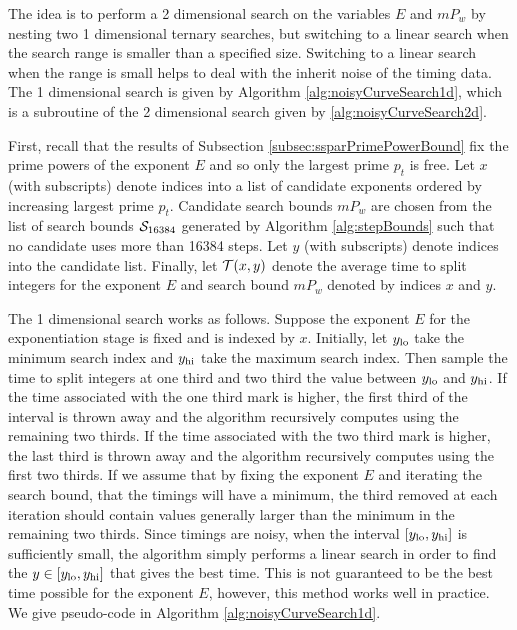 \documentclass{ucalgthes1}
\theoremstyle{definition}
\begin{document}
The idea is to perform a 2 dimensional search on the variables $E$ and $mP_w$ by nesting two 1 dimensional ternary searches, but switching to a linear search when the search range is smaller than a specified size.  Switching to a linear search when the range is small helps to deal with the inherit noise of the timing data.  The 1 dimensional search is given by Algorithm \ref{alg:noisyCurveSearch1d}, which is a subroutine of the 2 dimensional search given by \ref{alg:noisyCurveSearch2d}.

First, recall that the results of Subsection \ref{subsec:ssparPrimePowerBound} fix the prime powers of the exponent $E$ and so only the largest prime $p_t$ is free.  Let $x$ (with subscripts) denote indices into a list of candidate exponents ordered by increasing largest prime $p_t$.  Candidate search bounds $mP_w$ are chosen from the list of search bounds $\mathcal S_{16384}$ generated by Algorithm \ref{alg:stepBounds} such that no candidate uses more than 16384 steps.  Let $y$ (with subscripts) denote indices into the candidate list.  Finally, let $\mathcal T(x, y)$ denote the average time to split integers for the exponent $E$ and search bound $mP_w$ denoted by indices $x$ and $y$.

The 1 dimensional search works as follows.  Suppose the exponent $E$ for the exponentiation stage is fixed and is indexed by $x$. Initially, let $y_{\textrm{lo}}$ take the minimum search index and $y_{\textrm{hi}}$ take the maximum search index.  Then sample the time to split integers at one third and two third the value between $y_{\textrm{lo}}$ and $y_{\textrm{hi}}$.  If the time associated with the one third mark is higher, the first third of the interval is thrown away and the algorithm recursively computes using the remaining two thirds.  If the time associated with the two third mark is higher, the last third is thrown away and the algorithm recursively computes using the first two thirds.  If we assume that by fixing the exponent $E$ and iterating the search bound, that the timings will have a minimum, the third removed at each iteration should contain values generally larger than the minimum in the remaining two thirds.   Since timings are noisy, when the interval $[y_{\textrm{lo}}, y_{\textrm{hi}}]$ is sufficiently small, the algorithm simply performs a linear search in order to find the $y \in [y_{\textrm{lo}}, y_{\textrm{hi}}]$ that gives the best time.  This is not guaranteed to be the best time possible for the exponent $E$, however, this method works well in practice.  We give pseudo-code in Algorithm \ref{alg:noisyCurveSearch1d}.
\end{document}
